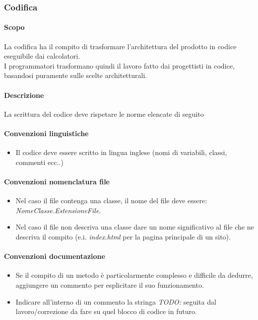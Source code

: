 \documentclass[a4paper, 12pt]{article}
\begin{document}
\subsubsection{Codifica}
\paragraph{Scopo}
La codifica ha il compito di trasformare l'architettura del prodotto in codice eseguibile dai calcolatori.\\
I programmatori trasformano quindi il lavoro fatto dai progettisti in codice, basandosi puramente sulle scelte architetturali.
\paragraph{Descrizione}
La scrittura del codice deve rispetare le norme elencate di seguito
\paragraph{Convenzioni linguistiche}
\begin{itemize}
	\item Il codice deve essere scritto in lingua inglese (nomi di variabili, classi, commenti ecc..)
\end{itemize}
\paragraph{Convenzioni nomenclatura file}
	\begin{itemize}
		\item Nel caso il file contenga una classe, il nome del file deve essere: \textit{NomeClasse.EstensioneFile}.
		\item Nel caso il file non descriva una classe dare un nome significativo al file che ne descriva il compito
		(e.i. \textit{index.html} per la pagina principale di un sito). 
	\end{itemize}
\paragraph{Convenzioni documentazione}
	\begin{itemize}
		\item Se il compito di un metodo è particolarmente complesso e difficile da dedurre, aggiungere un commento
		per esplicitare il suo funzionamento.
		\item Indicare all'interno di un commento la stringa \textit{TODO:} seguita dal lavoro/correzione da fare su quel 
		blocco di codice in futuro.
	\end{itemize}
\end{document}
